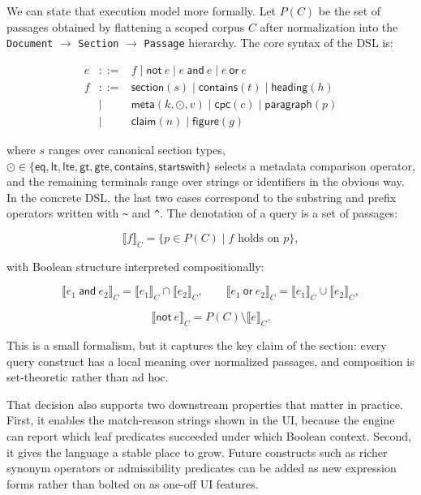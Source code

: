 \documentclass[sigconf]{acmart}
\newcommand{\DocSectionPassage}{\texttt{Document} $\to$ \texttt{Section} $\to$ \texttt{Passage}}
\begin{document}
We can state that execution model more formally. Let $P(C)$ be the set of
passages obtained by flattening a scoped corpus $C$ after normalization into
the \DocSectionPassage{} hierarchy. The core syntax of the DSL is:

$$
\begin{array}{rcl}
e & ::= & f \mid \textsf{not}\ e \mid e\ \textsf{and}\ e \mid e\ \textsf{or}\ e \\
f & ::= & \textsf{section}(s) \mid \textsf{contains}(t) \mid \textsf{heading}(h) \\
  & \mid & \textsf{meta}(k, \odot, v) \mid \textsf{cpc}(c) \mid \textsf{paragraph}(p) \\
  & \mid & \textsf{claim}(n) \mid \textsf{figure}(g)
\end{array}
$$

where $s$ ranges over canonical section types,
$\odot \in \{\textsf{eq},\textsf{lt},\textsf{lte},\textsf{gt},\textsf{gte},\textsf{contains},\textsf{startswith}\}$
selects a metadata comparison operator, and the remaining terminals range over
strings or identifiers in the obvious way. In the concrete DSL, the last two
cases correspond to the substring and prefix operators written with
\texttt{\~{}} and \texttt{\string^}. The denotation of a query is a set of
passages:

$$
\llbracket f \rrbracket_C = \{ p \in P(C) \mid f\text{ holds on }p \},
$$

with Boolean structure interpreted compositionally:

$$
\llbracket e_1\ \textsf{and}\ e_2 \rrbracket_C = \llbracket e_1 \rrbracket_C \cap \llbracket e_2 \rrbracket_C,
\qquad
\llbracket e_1\ \textsf{or}\ e_2 \rrbracket_C = \llbracket e_1 \rrbracket_C \cup \llbracket e_2 \rrbracket_C,
$$

$$
\llbracket \textsf{not}\ e \rrbracket_C = P(C) \setminus \llbracket e \rrbracket_C.
$$

This is a small formalism, but it captures the key claim of the section: every
query construct has a local meaning over normalized passages, and composition
is set-theoretic rather than ad hoc.

That decision also supports two downstream properties that matter in practice.
First, it enables the match-reason strings shown in the UI, because the engine
can report which leaf predicates succeeded under which Boolean context. Second,
it gives the language a stable place to grow. Future constructs such as richer
synonym operators or admissibility predicates can be added as new expression
forms rather than bolted on as one-off UI features.
\end{document}
